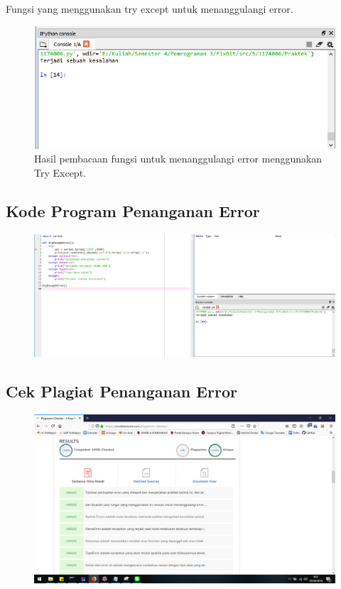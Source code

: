 \hfill \break
Fungsi yang menggunakan try except untuk menanggulangi error.



\begin{figure}[H]
	\includegraphics[width=12cm]{figures/5/1174086/Praktek/5.png}
	\centering
	\caption{Hasil pembacaan fungsi untuk menanggulangi error menggunakan Try Except.}
\end{figure}

\subsection{Kode Program Penanganan Error}
\begin{figure}[H]
	\includegraphics[width=12cm]{figures/5/1174086/Praktek/error.png}
	\centering
\end{figure}

\subsection{Cek Plagiat Penanganan Error}
\begin{figure}[H]
	\includegraphics[width=12cm]{figures/5/1174086/Praktek/plagiaterror.png}
	\centering
\end{figure}
